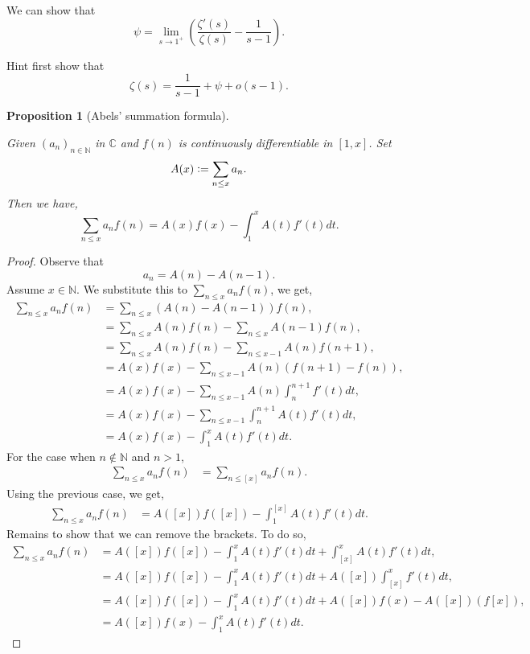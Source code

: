 \documentclass{article}
\newtheorem{proposition}{Proposition}[section]
\newcommand{\defeq}{\vcentcolon=}
\newcommand{\N}[0]{\mathbb{N}}
\newcommand{\C}[0]{\mathbb{C}}
\begin{document}
We can show that 
\begin{equation*}
  \psi = \lim_{s\to 1^+}\left({\frac {\zeta'(s)} {\zeta(s)}}-{\frac 1 {s-1}}\right).
\end{equation*}

Hint first show that 
\begin{equation*}
  \zeta(s) = {\frac 1 {s-1}}+\psi+o(s-1).
\end{equation*}

\begin{proposition}[Abels' summation formula]
  \label{proposition_abel_summation}
\par Given $(a_n)_{n\in \N}$ in $\C$ and $f(n)$ is continuously differentiable in $[1,x]$. Set
\begin{equation*}
  A(x) \defeq \sum_{n\leq x}a_n.
\end{equation*}
Then we have,
\begin{equation*}
  \sum_{n\leq x}a_nf(n) = A(x)f(x) - \int_1^x A(t)f'(t)dt.
\end{equation*}
\end{proposition}

\begin{proof}
  Observe that 
  \begin{equation*}
    a_n = A(n) - A(n-1).
  \end{equation*}
  Assume $x\in \N$. We substitute this to $\sum_{n\leq x}a_nf(n)$, we get,
  \begin{align*}
    \sum_{n\leq x}a_nf(n) & = \sum_{n\leq x}\left(A(n) - A(n-1)\right)f(n),\\
    & = \sum_{n\leq x}A(n)f(n) - \sum_{n\leq x}A(n-1)f(n),\\
    & = \sum_{n\leq x}A(n)f(n)-\sum_{n\leq x-1}A(n)f(n+1),\\
    & = A(x)f(x) - \sum_{n\leq x-1} A(n)(f(n+1)-f(n)),\\
    & = A(x)f(x) - \sum_{n\leq x-1}A(n)\int_{n}^{n+1}f'(t)dt,\\
    & = A(x)f(x) -\sum_{n\leq x-1}\int_{n}^{n+1}A(t)f'(t)dt,\\
    & = A(x)f(x) - \int_1^{x} A(t)f'(t)dt.
  \end{align*}
  For the case when $n\not\in\N$ and $n>1$, 
  \begin{align*}
    \sum_{n\leq x} a_n f(n) & = \sum_{n\leq [x]}a_nf(n).
  \end{align*}
  Using the previous case, we get,
  \begin{align*}
    \sum_{n\leq x} a_n f(n) & = A([x])f([x]) - \int_1^{[x]}A(t)f'(t)dt.
  \end{align*}
  Remains to show that we can remove the brackets. To do so,
  \begin{align*}
    \sum_{n\leq x} a_n f(n) & = A([x])f([x])-\int_1^x A(t)f'(t)dt + \int_{[x]}^x A(t)f'(t)dt,\\
    & = A([x])f([x]) - \int_1^x A(t)f'(t)dt + A([x])\int_{[x]}^{x}f'(t)dt ,\\
    & = A([x])f([x])- \int_1^x A(t)f'(t)dt + A([x])f(x) - A([x])(f[x]),\\
     & =  A([x])f(x)- \int_1^x A(t)f'(t)dt.
  \end{align*}
\end{proof}
\end{document}
